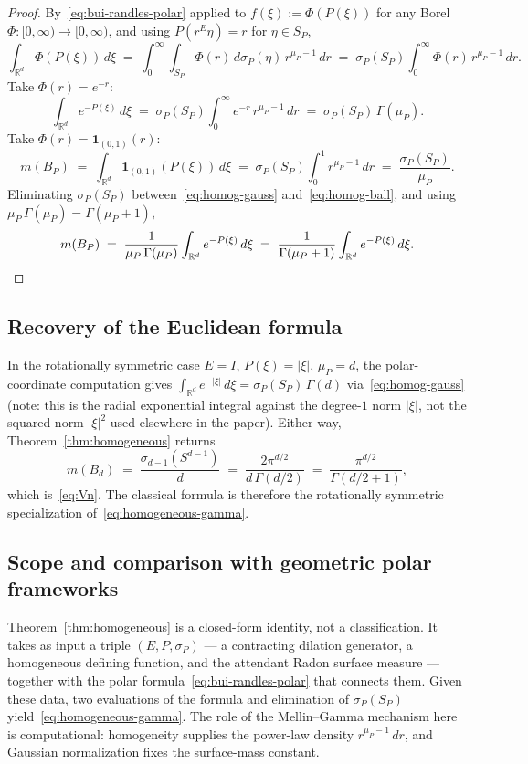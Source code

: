 \documentclass[11pt,a4paper]{article}
\theoremstyle{plain}
\theoremstyle{definition}
\theoremstyle{remark}
\newcommand{\R}{\mathbb{R}}
\begin{document}
\begin{proof}
By~\eqref{eq:bui-randles-polar} applied to $f(\xi) := \Phi(P(\xi))$ for any Borel $\Phi\colon[0,\infty)\to[0,\infty)$, and using $P(r^E\eta) = r$ for $\eta\in S_P$,
\[
\int_{\R^d}\Phi(P(\xi))\,d\xi \;=\; \int_0^\infty\!\int_{S_P}\Phi(r)\,d\sigma_P(\eta)\,r^{\mu_P-1}\,dr \;=\; \sigma_P(S_P)\int_0^\infty \Phi(r)\,r^{\mu_P-1}\,dr.
\]
Take $\Phi(r) = e^{-r}$:
\begin{equation}\label{eq:homog-gauss}
\int_{\R^d} e^{-P(\xi)}\,d\xi \;=\; \sigma_P(S_P)\int_0^\infty e^{-r}\,r^{\mu_P-1}\,dr \;=\; \sigma_P(S_P)\,\Gamma(\mu_P).
\end{equation}
Take $\Phi(r) = \mathbf 1_{(0,1)}(r)$:
\begin{equation}\label{eq:homog-ball}
m(B_P) \;=\; \int_{\R^d}\mathbf 1_{(0,1)}(P(\xi))\,d\xi \;=\; \sigma_P(S_P)\int_0^1 r^{\mu_P-1}\,dr \;=\; \frac{\sigma_P(S_P)}{\mu_P}.
\end{equation}
Eliminating $\sigma_P(S_P)$ between~\eqref{eq:homog-gauss} and~\eqref{eq:homog-ball}, and using $\mu_P\,\Gamma(\mu_P)=\Gamma(\mu_P+1)$,
\[
m(B_P) \;=\; \frac{1}{\mu_P\,\Gamma(\mu_P)}\int_{\R^d}e^{-P(\xi)}\,d\xi \;=\; \frac{1}{\Gamma(\mu_P+1)}\int_{\R^d}e^{-P(\xi)}\,d\xi. \qedhere
\]
\end{proof}

\subsection*{Recovery of the Euclidean formula}

In the rotationally symmetric case $E=I$, $P(\xi) = |\xi|$, $\mu_P = d$, the polar-coordinate computation gives $\int_{\R^d} e^{-|\xi|}\,d\xi = \sigma_P(S_P)\,\Gamma(d)$ via~\eqref{eq:homog-gauss} (note: this is the radial exponential integral against the degree-$1$ norm $|\xi|$, not the squared norm $|\xi|^2$ used elsewhere in the paper). Either way, Theorem~\ref{thm:homogeneous} returns
\[
m(B_d) \;=\; \frac{\sigma_{d-1}(S^{d-1})}{d} \;=\; \frac{2\pi^{d/2}}{d\,\Gamma(d/2)} \;=\; \frac{\pi^{d/2}}{\Gamma(d/2+1)},
\]
which is~\eqref{eq:Vn}. The classical formula is therefore the rotationally symmetric specialization of~\eqref{eq:homogeneous-gamma}.

\subsection*{Scope and comparison with geometric polar frameworks}

Theorem~\ref{thm:homogeneous} is a closed-form identity, not a classification. It takes as input a triple $(E,P,\sigma_P)$ — a contracting dilation generator, a homogeneous defining function, and the attendant Radon surface measure — together with the polar formula~\eqref{eq:bui-randles-polar} that connects them. Given these data, two evaluations of the formula and elimination of $\sigma_P(S_P)$ yield~\eqref{eq:homogeneous-gamma}. The role of the Mellin--Gamma mechanism here is computational: homogeneity supplies the power-law density $r^{\mu_P-1}\,dr$, and Gaussian normalization fixes the surface-mass constant.
\end{document}
